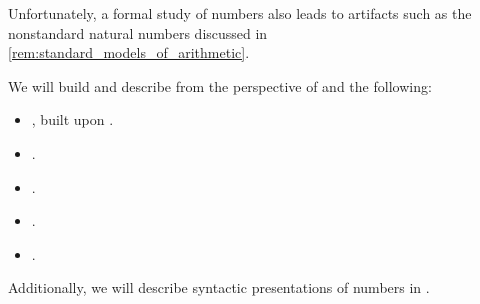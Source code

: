 Unfortunately, a formal study of numbers also leads to artifacts such as the nonstandard natural numbers discussed in \cref{rem:standard_models_of_arithmetic}.

We will build and describe from the perspective of  and  the following:
\begin{itemize}
  \item {}, built upon .
  \item {}.
  \item {}.
  \item {}.
  \item {}.
\end{itemize}

Additionally, we will describe syntactic presentations of numbers in .
